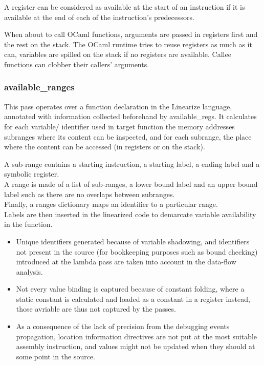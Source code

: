 A register can be considered as available at the start of an instruction
if it is available at the end of each of the instruction's predecessors.

When about to call OCaml functions, arguments are passed in registers first
and the rest on the stack.
The OCaml runtime tries to reuse registers as much as it can, variables
are spilled on the stack if no registers are available.
Callee functions can clobber their callers' arguments.

\subsubsection{available\_ranges}

This pass operates over a function declaration in the Linearize language,
annotated with information collected beforehand by available\_regs.
It calculates for each variable/ identifier used in target function the memory
addresses subranges where its content can be inspected, and for each subrange, the
place where the content can be accessed (in registers or on the stack).

A sub-range contains a starting instruction, a starting label, a ending label
and a symbolic register.\\
A range is made of a list of sub-ranges, a lower bound label and an upper bound label
such as there are no overlaps between subranges.\\
Finally, a ranges dictionary maps an identifier to a particular range.\\

Labels are then inserted in the linearized code to demarcate variable availability in the
function.


\begin{itemize}
    \item Unique identifiers generated because of variable shadowing, and identifiers not present in the source (for
        bookkeeping purposes such as bound checking) introduced at the lambda pass
        are taken into account in the data-flow analysis.
    \item Not every value binding is captured because of constant folding, where a static
        constant is calculated and loaded as a constant in a register instead, those
        avriable are thus not captured by the passes.
    \item As a consequence of the lack of precision from the debugging events propagation,
        location information directives are not put at the most suitable assembly instruction,
        and values might not be updated when they should at some point in the source.
\end{itemize}

